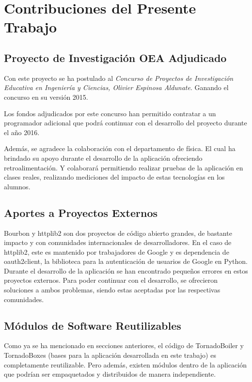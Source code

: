 \chapter{Contribuciones del Presente
Trabajo}\label{contribuciones-del-presente-trabajo}

\section{Proyecto de Investigación OEA
Adjudicado}\label{proyecto-de-investigaciuxf3n-oea-adjudicado}

Con este proyecto se ha postulado al \emph{Concurso de Proyectos de
Investigación Educativa en Ingeniería y Ciencias, Olivier Espinosa
Aldunate}. Ganando el concurso en su versión 2015.

Los fondos adjudicados por este concurso han permitido contratar a un
programador adicional que podrá continuar con el desarrollo del proyecto
durante el año 2016.

Además, se agradece la colaboración con el departamento de física. El
cual ha brindado su apoyo durante el desarrollo de la aplicación
ofreciendo retroalimentación. Y colaborará permitiendo realizar pruebas
de la aplicación en clases reales, realizando mediciones del impacto de
estas tecnologías en los alumnos.

\section{Aportes a Proyectos
Externos}\label{aportes-a-proyectos-externos}

Bourbon y httplib2 son dos proyectos de código abierto grandes, de
bastante impacto y con comunidades internacionales de desarrolladores.
En el caso de httplib2, este es mantenido por trabajadores de Google y
es dependencia de oauth2client, la biblioteca para la autenticación de
usuarios de Google en Python. Durante el desarrollo de la aplicación se
han encontrado pequeños errores en estos proyectos externos. Para poder
continuar con el desarrollo, se ofrecieron soluciones a ambos problemas,
siendo estas aceptadas por las respectivas comunidades.

\section{Módulos de Software
Reutilizables}\label{muxf3dulos-de-software-reutilizables}

Como ya se ha mencionado en secciones anteriores, el código de
TornadoBoiler y TornadoBoxes (bases para la aplicación desarrollada en
este trabajo) es completamente reutilizable. Pero además, existen
módulos dentro de la aplicación que podrían ser empaquetados y
distribuidos de manera independiente.

